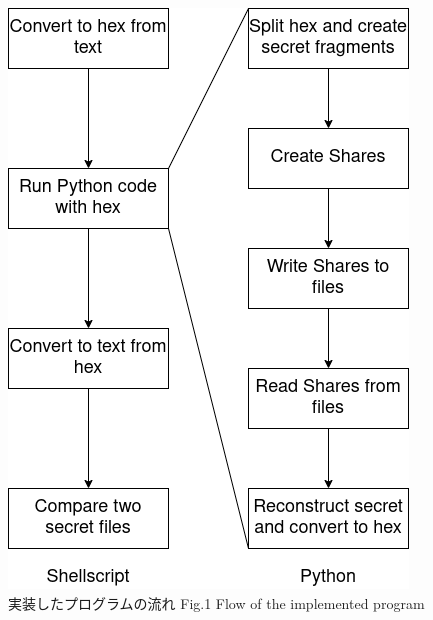 \documentclass[twocolumn,a4paper]{jsarticle}
\begin{document}
	\begin{figure}[ht]
		\centering
		\includegraphics[keepaspectratio,scale=0.37]{program.png}
		\caption{
			\centering
			実装したプログラムの流れ \protect \linebreak
			Fig.1 Flow of the implemented program
			}
	\end{figure}
\end{document}
